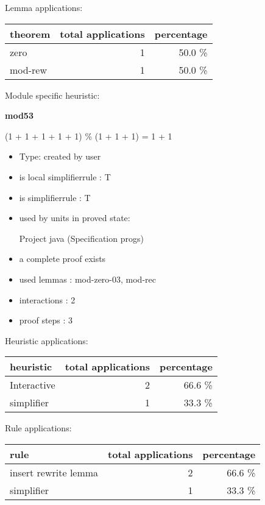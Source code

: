 \documentclass[a4paper]{article}
\begin{document}
Lemma applications:

\begin{supertabular}{l|r|r}
theorem	        & total applications & percentage \\ \hline
zero & 1 & 50.0 \% \\
mod-rew & 1 & 50.0 \% \\

\end{supertabular}

Module specific heuristic:

\pagebreak

{\LARGE\bf mod53}\label{lemma-mod53}

\medskip

 \Fol (1 + 1 + 1 + 1 + 1) \% (1 + 1 + 1) = 1 + 1

\begin{itemize}

\item Type: created by user

\item is local simplifierrule : T
\item is simplifierrule : T
\item used by units in proved state:

Project java (Specification progs)
\item       a complete proof exists
\item       used lemmas  : mod-zero-03, mod-rec
\item       interactions : 2
\item       proof steps  : 3
\end{itemize}

\medskip


Heuristic applications:

\begin{supertabular}{l|r|r}
heuristic	& total applications & percentage \\ \hline
Interactive & 2 & 66.6 \% \\
simplifier & 1 & 33.3 \% \\

\end{supertabular}

Rule applications:

\begin{supertabular}{l|r|r}
rule	        & total applications & percentage \\ \hline
insert rewrite lemma & 2 & 66.6 \% \\
simplifier & 1 & 33.3 \% \\

\end{supertabular}
\end{document}
